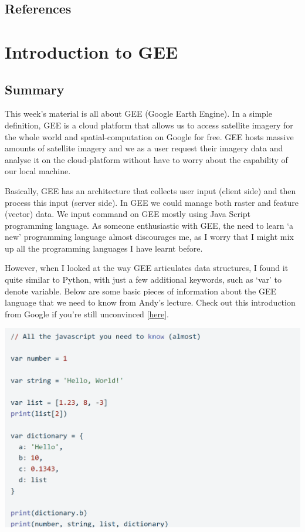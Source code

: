 \documentclass[
  letterpaper,
  DIV=11,
  numbers=noendperiod]{scrreprt}
\begin{document}
\hypertarget{references-1}{%
\section{References}\label{references-1}}


\hypertarget{introduction-to-gee}{%
\chapter{Introduction to GEE}\label{introduction-to-gee}}

\hypertarget{summary-4}{%
\section{Summary}\label{summary-4}}

This week's material is all about GEE (Google Earth Engine). In a simple
definition, GEE is a cloud platform that allows us to access satellite
imagery for the whole world and spatial-computation on Google for free.
GEE hosts massive amounts of satellite imagery and we as a user request
their imagery data and analyse it on the cloud-platform without have to
worry about the capability of our local machine.

Basically, GEE has an architecture that collects user input (client
side) and then process this input (server side). In GEE we could manage
both raster and feature (vector) data. We input command on GEE mostly
using Java Script programming language. As someone enthusiastic with
GEE, the need to learn `a new' programming language almost discourages
me, as I worry that I might mix up all the programming languages I have
learnt before.

However, when I looked at the way GEE articulates data structures, I
found it quite similar to Python, with just a few additional keywords,
such as `var' to denote variable. Below are some basic pieces of
information about the GEE language that we need to know from Andy's
lecture. Check out this introduction from Google if you're still
unconvinced
{[}\href{https://developers.google.com/earth-engine/tutorials/tutorial_js_01}{here}{]}.

\includegraphics[width=5.29167in,height=\textheight]{images/clipboard-203956171.png}
\end{document}
